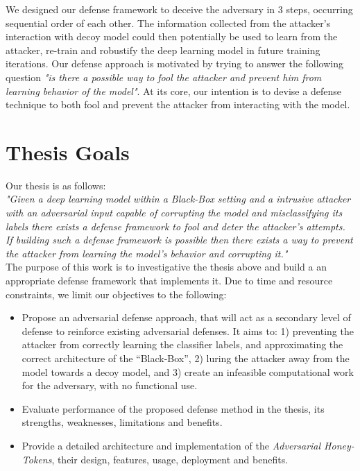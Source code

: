 \documentclass[grad,lot,lof,11pt,oneside,onehalfspace]{RUthesis}
\begin{document}
  We designed our defense framework to deceive the adversary in 3 steps, occurring sequential order of each other. The information collected from the attacker's interaction with decoy model could then potentially be used to  learn from the attacker, re-train and robustify the deep learning model in future training iterations. Our defense approach is motivated by trying to answer the following question \textit{"is there a possible way to fool the attacker and prevent him from learning behavior of the model"}. At its core, our intention is to devise a defense technique to both fool and prevent the attacker from interacting with the model.
\section{Thesis Goals}
Our thesis is as follows:\newline\\
\textit{"Given a deep learning model within a Black-Box setting and a intrusive attacker with an adversarial input capable of corrupting the model and misclassifying its labels there exists a defense framework to fool and deter the attacker's attempts. If building such a defense  framework is possible then there exists a way to prevent the attacker from learning the model's behavior and corrupting it."}\newline\\
The purpose of this work is to investigative the thesis above and build a an appropriate defense framework that implements it. Due to time and resource constraints, we limit our objectives to the following:
\begin{itemize}
	\item Propose an adversarial defense approach, that will act as a secondary level of defense to reinforce existing adversarial defenses. It aims to: 1) preventing the attacker from correctly learning the classifier labels, and approximating the correct architecture of the “Black-Box”, 2) luring the attacker away from the model towards a decoy model, and 3) create an infeasible computational work for the adversary, with no functional use.
	\item Evaluate performance of the proposed defense method in the thesis, its strengths, weaknesses, limitations and benefits. 
	\item Provide a detailed architecture and implementation of the \textit{Adversarial Honey-Tokens}, their design, features, usage, deployment and benefits.  
\end{itemize}
\end{document}
